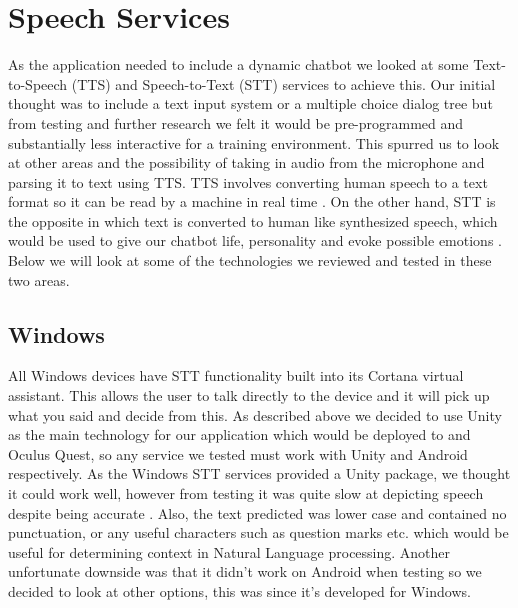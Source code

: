 \section{Speech Services}
As the application needed to include a dynamic chatbot we looked at some Text-to-Speech (TTS) and Speech-to-Text (STT) services to achieve this. Our initial thought was to include a text input system or a multiple choice dialog tree but from testing and further research we felt it would be pre-programmed and substantially less interactive for a training environment. This spurred us to look at other areas and the possibility of taking in audio from the microphone and parsing it to text using TTS. TTS involves converting human speech to a text format so it can be read by a machine in real time \cite{EJ122858920190101}. On the other hand, STT is the opposite in which text is converted to human like synthesized speech, which would be used to give our chatbot life, personality and evoke possible emotions \cite{ED60067020190801}. Below we will look at some of the technologies we reviewed and tested in these two areas.

\subsection{Windows}
All Windows devices have STT functionality built into its Cortana virtual assistant. This allows the user to talk directly to the device and it will pick up what you said and decide from this. As described above we decided to use Unity as the main technology for our application which would be deployed to and Oculus Quest, so any service we tested must work with Unity and Android respectively. As the Windows STT services provided a Unity package, we thought it could work well, however from testing it was quite slow at depicting speech despite being accurate \cite{unityspeech}. Also, the text predicted was lower case and contained no punctuation, or any useful characters such as question marks etc. which would be useful for determining context in Natural Language processing. Another unfortunate downside was that it didn't work on Android when testing so we decided to look at other options, this was since it's developed for Windows. 

